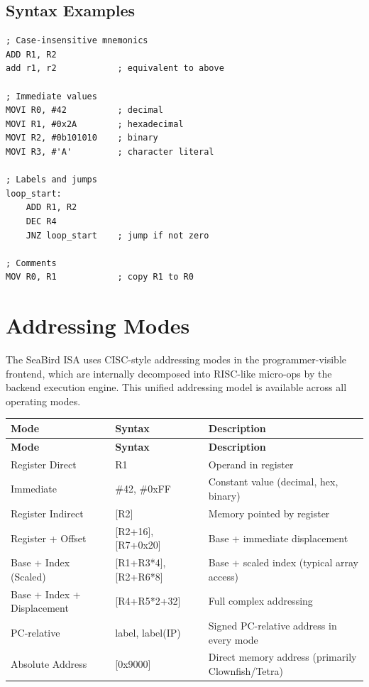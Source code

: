 \documentclass[11pt]{article}
\begin{document}
\subsection{Syntax Examples}

\begin{lstlisting}
; Case-insensitive mnemonics
ADD R1, R2
add r1, r2            ; equivalent to above

; Immediate values
MOVI R0, #42          ; decimal
MOVI R1, #0x2A        ; hexadecimal
MOVI R2, #0b101010    ; binary
MOVI R3, #'A'         ; character literal

; Labels and jumps
loop_start:
    ADD R1, R2
    DEC R4
    JNZ loop_start    ; jump if not zero

; Comments
MOV R0, R1            ; copy R1 to R0
\end{lstlisting}

\section{Addressing Modes}

The SeaBird ISA uses CISC-style addressing modes in the programmer-visible frontend, which are internally decomposed into RISC-like micro-ops by the backend execution engine. This unified addressing model is available across all operating modes.

\begin{longtable}{@{}lll@{}}
\toprule
\textbf{Mode} & \textbf{Syntax} & \textbf{Description} \\ \midrule
\endfirsthead
\toprule
\textbf{Mode} & \textbf{Syntax} & \textbf{Description} \\ \midrule
\endhead
Register Direct & R1 & Operand in register \\
Immediate & \#42, \#0xFF & Constant value (decimal, hex, binary) \\
Register Indirect & [R2] & Memory pointed by register \\
Register + Offset & [R2+16], [R7+0x20] & Base + immediate displacement \\
Base + Index (Scaled) & [R1+R3*4], [R2+R6*8] & Base + scaled index (typical array access) \\
Base + Index + Displacement & [R4+R5*2+32] & Full complex addressing \\
PC-relative & label, label(IP) & Signed PC-relative address in every mode \\
Absolute Address & [0x9000] & Direct memory address (primarily Clownfish/Tetra) \\ \bottomrule
\end{longtable}
\end{document}
